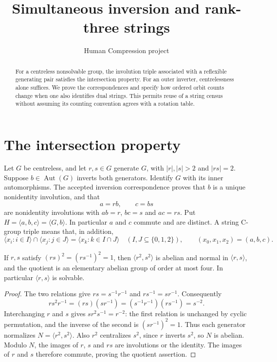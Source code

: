 \documentclass[11pt,a4paper]{article}
\title{Simultaneous inversion and rank-three strings}
\author{Human Compression project}\date{}
\newcommand{\Aut}{\operatorname{Aut}}
\begin{document}
\maketitle
\begin{abstract}
For a centreless nonsolvable group, the involution triple associated
with a reflexible generating pair satisfies the intersection property.
For an outer inverter, centrelessness alone suffices. We prove the
correspondences and specify how ordered orbit counts change when one
also identifies dual strings. This permits reuse of a string census
without assuming its counting convention agrees with a rotation table.
\end{abstract}

\section{The intersection property}
Let $G$ be centreless, and let $r,s\in G$ generate $G$, with
$|r|,|s|>2$ and $|rs|=2$. Suppose $b\in\Aut(G)$ inverts both
generators. Identify $G$ with its inner automorphisms. The accepted
inversion correspondence proves that $b$ is a unique nonidentity
involution, and that
\[
 a=rb,\qquad c=bs
\]
are nonidentity involutions with $ab=r$, $bc=s$ and $ac=rs$.
Put $H=\langle a,b,c\rangle=\langle G,b\rangle$.
In particular $a$ and $c$ commute and are distinct. A string C-group
triple means that, in addition,
\[
 \langle x_i:i\in I\rangle\cap\langle x_j:j\in J\rangle
   =\langle x_k:k\in I\cap J\rangle
 \quad(I,J\subseteq\{0,1,2\}),\qquad(x_0,x_1,x_2)=(a,b,c).
                                                        \tag{1}
\]

\begin{lemma}\label{solvable}
If $r,s$ satisfy $(rs)^2=(rs^{-1})^2=1$, then
$\langle r^2,s^2\rangle$ is abelian and normal in $\langle r,s\rangle$,
and the quotient is an elementary abelian group of order at most four.
In particular $\langle r,s\rangle$ is solvable.
\end{lemma}
\begin{proof}
The two relations give $rs=s^{-1}r^{-1}$ and $rs^{-1}=sr^{-1}$.
Consequently
\[
 rs^2r^{-1}=(rs)(sr^{-1})=(s^{-1}r^{-1})(rs^{-1})=s^{-2}.
\]
Interchanging $r$ and $s$ gives $sr^2s^{-1}=r^{-2}$: the first
relation is unchanged by cyclic permutation, and the inverse of the
second is $(sr^{-1})^2=1$. Thus each generator normalizes
$N=\langle r^2,s^2\rangle$. Also $r^2$ centralizes $s^2$, since
$r$ inverts $s^2$, so $N$ is abelian. Modulo $N$, the images of
$r$, $s$ and $rs$ are involutions or the identity. The images of
$r$ and $s$ therefore commute, proving the quotient assertion.
\end{proof}
\end{document}
